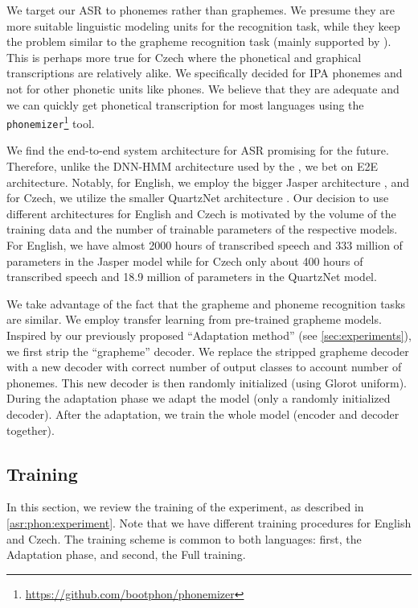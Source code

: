 We target our ASR to phonemes rather than graphemes. We presume they are more suitable linguistic modeling units for the recognition task, while they keep the problem similar to the grapheme recognition task (mainly supported by  ). This is perhaps more true for Czech where the phonetical and graphical transcriptions are relatively alike. We specifically decided for IPA phonemes and not for other phonetic units like phones. We believe that they are adequate and we can quickly get phonetical transcription for most languages using the \texttt{phonemizer}\footnote{\url{https://github.com/bootphon/phonemizer}} tool.

We find the end-to-end system architecture for ASR promising for the future. Therefore, unlike the DNN-HMM architecture used by the , we bet on E2E architecture. Notably, for English, we employ the bigger Jasper architecture , and for Czech, we utilize the smaller QuartzNet architecture . Our decision to use different architectures for English and Czech is motivated by the volume of the training data and the number of trainable parameters of the respective models. For English, we have almost 2000 hours of transcribed speech and 333 million of parameters in the Jasper model while for Czech only about 400 hours of transcribed speech and 18.9 million of parameters in the QuartzNet model.

We take advantage of the fact that the grapheme and phoneme recognition tasks are similar. We employ transfer learning from pre-trained grapheme models. Inspired by our previously proposed ``Adaptation method'' (see \cref{sec:experiments}), we first strip the ``grapheme'' decoder. We replace the stripped grapheme decoder with a new decoder with correct number of output classes to account number of phonemes. This new decoder is then randomly initialized (using Glorot uniform). During the adaptation phase we adapt the model (only a randomly initialized decoder). After the adaptation, we train the whole model (encoder and decoder together).

\subsection{Training}
\label{asr:phon:training}
In this section, we review the training of the experiment, as described in \cref{asr:phon:experiment}. Note that we have different training procedures for English and Czech. The training scheme is common to both languages: first, the Adaptation phase, and second, the Full training.

